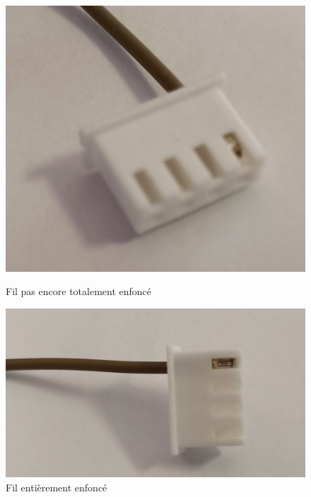 \documentclass{article}
\begin{document}
\begin{figure}[h]
    \begin{minipage}{0.45\textwidth}
        \centering
        \includegraphics[width=\linewidth]{images/fil_pas_encore_totalement_enfonce_JST.jpg}
        \captionsetup{labelformat=empty}
        \caption{Fil pas encore totalement enfoncé}
        \label{fig:image1}
    \end{minipage}
    \hfill
    \begin{minipage}{0.45\textwidth}
        \centering
        \includegraphics[width=\linewidth]{images/JST_resultat_final.jpg}
        \captionsetup{labelformat=empty}
        \caption{Fil entièrement enfoncé}
        \label{fig:image2}
    \end{minipage}
\end{figure}
\end{document}
